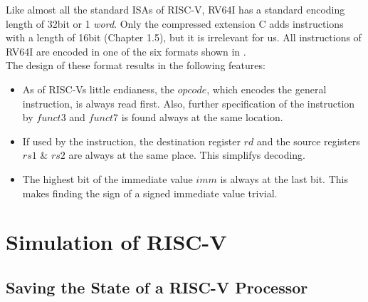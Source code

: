 Like almost all the standard ISAs of RISC-V, RV64I has a standard encoding
length of 32bit or 1 \emph{word}. Only the compressed extension C adds
instructions with a length of 16bit \cite{riscv-isa}(Chapter 1.5), but it is
irrelevant for us. All instructions of RV64I are encoded in one of the six
formats shown in .\\ The design of these format
results in the following features:
\begin{itemize}
    \item As of RISC-Vs little endianess, the $opcode$, which encodes the general
          instruction, is always read first. Also, further specification of the
          instruction by $funct3$ and $funct7$ is found always at the same location.
    \item If used by the instruction, the destination register $rd$ and the source
          registers $rs1$ \& $rs2$ are always at the same place. This simplifys decoding.
    \item The highest bit of the immediate value $imm$ is always at the last bit. This
          makes finding the sign of a signed immediate value trivial.
\end{itemize}



\section{Simulation of RISC-V}

\subsection{Saving the State of a RISC-V Processor}\label{statefile}